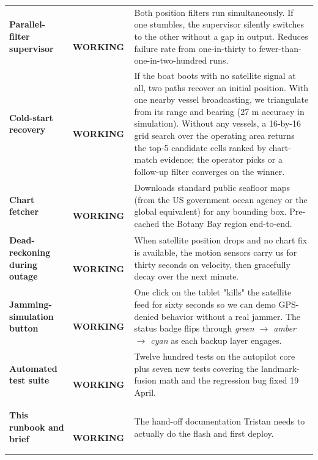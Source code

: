 \documentclass[10pt,a4paper]{article}
\newcommand{\statusbuilt}{{\small\color{white}\colorbox{mSafe}{\,\strut\bfseries\sffamily WORKING\,}}}
\begin{document}
\begin{tabularx}{\textwidth}{@{}l l X@{}}
\textbf{Parallel-filter supervisor} & \statusbuilt & Both position filters run simultaneously. If one stumbles, the supervisor silently switches to the other without a gap in output. Reduces failure rate from one-in-thirty to fewer-than-one-in-two-hundred runs. \\
\rowcolor{mRow} \textbf{Cold-start recovery} & \statusbuilt & If the boat boots with no satellite signal at all, two paths recover an initial position. With one nearby vessel broadcasting, we triangulate from its range and bearing (27 m accuracy in simulation). Without any vessels, a 16-by-16 grid search over the operating area returns the top-5 candidate cells ranked by chart-match evidence; the operator picks or a follow-up filter converges on the winner. \\
\textbf{Chart fetcher} & \statusbuilt & Downloads standard public seafloor maps (from the US government ocean agency or the global equivalent) for any bounding box. Pre-cached the Botany Bay region end-to-end. \\
\rowcolor{mRow} \textbf{Dead-reckoning during outage} & \statusbuilt & When satellite position drops and no chart fix is available, the motion sensors carry us for thirty seconds on velocity, then gracefully decay over the next minute. \\
\textbf{Jamming-simulation button} & \statusbuilt & One click on the tablet "kills" the satellite feed for sixty seconds so we can demo GPS-denied behavior without a real jammer. The status badge flips through \textit{green $\to$ amber $\to$ cyan} as each backup layer engages. \\
\rowcolor{mRow} \textbf{Automated test suite} & \statusbuilt & Twelve hundred tests on the autopilot core plus seven new tests covering the landmark-fusion math and the regression bug fixed 19 April. \\
\textbf{This runbook and brief} & \statusbuilt & The hand-off documentation Tristan needs to actually do the flash and first deploy. \\
\bottomrule
\end{tabularx}
\end{document}
